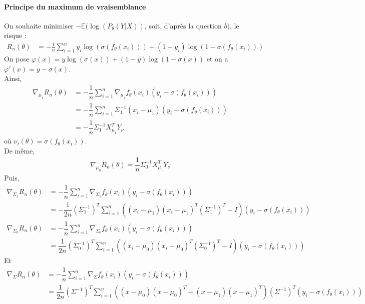 \documentclass[paper=a4, fontsize=11pt]{article}
\begin{document}
\paragraph{Principe du maximum de vraisemblance\\}
On souhaite minimiser $-\mathbb{E}(\log(P_{\theta}(Y|X))$, soit, d'après la question $b)$, le risque : 
\begin{align*}
R_n(\theta) &= -\frac{1}{n}\sum\limits_{i=1}^{n} y_i\log (\sigma(f_{\theta}(x_i))) + (1-y_i)\log(1-\sigma(f_{\theta}(x_i)))
\end{align*}
On pose $\varphi(x) =  y\log (\sigma(x)) + (1-y)\log(1-\sigma(x))$ et on a
$\varphi'(x) = y - \sigma(x)$.\\
Ainsi, 
\begin{align*}
\nabla_{\mu_1}R_n(\theta) &= -\dfrac{1}{n}\sum\limits_{i=1}^{n} \nabla_{\mu_1}f_{\theta}(x_i)(y_i - \sigma(f_{\theta}(x_i))) \\
&= -\dfrac{1}{n}\sum\limits_{i=1}^{n} \Sigma_{1}^{-1}(x_i-\mu_{1})(y_i - \sigma(f_{\theta}(x_i))) \\
&= -\dfrac{1}{n}\Sigma_{1}^{-1} X_{\mu_1}^{T}Y_{\nu}
\end{align*}
où $\nu_i(\theta) = \sigma(f_{\theta}(x_i))$.\\
De même, 
\begin{align*}
\nabla_{\mu_0}R_n(\theta) =  \dfrac{1}{n}\Sigma_{0}^{-1} X_{\mu_1}^{T}Y_{\nu}
\end{align*}
Puis, 
\begin{align*}
\nabla_{\Sigma_1}R_n(\theta) &= -\dfrac{1}{n}\sum\limits_{i=1}^{n} \nabla_{\Sigma_1}f_{\theta}(x_i)(y_i - \sigma(f_{\theta}(x_i))) \\
&= -\dfrac{1}{2n}(\Sigma_1^{-1})^{T}\sum\limits_{i=1}^{n} ((x_i-\mu_1)(x_i-\mu_1)^{T}(\Sigma_1^{-1})^{T} - I)(y_i - \sigma(f_{\theta}(x_i))) \\
\nabla_{\Sigma_0}R_n(\theta) &= -\dfrac{1}{n}\sum\limits_{i=1}^{n} \nabla_{\Sigma_0}f_{\theta}(x_i)(y_i - \sigma(f_{\theta}(x_i))) \\
&= \dfrac{1}{2n}(\Sigma_0^{-1})^{T}\sum\limits_{i=1}^{n} ((x_i-\mu_0)(x_i-\mu_0)^{T}(\Sigma_0^{-1})^{T} - I)(y_i - \sigma(f_{\theta}(x_i)))
\end{align*}
Et 
\begin{align*}
\nabla_{\Sigma}R_n(\theta) &= -\dfrac{1}{n}\sum\limits_{i=1}^{n} \nabla_{\Sigma}f_{\theta}(x_i)(y_i - \sigma(f_{\theta}(x_i))) \\
&= \dfrac{1}{2n}(\Sigma^{-1})^{T}\sum\limits_{i=1}^{n}((x-\mu_0)(x-\mu_0)^{T}-(x-\mu_1)(x-\mu_1)^{T})(\Sigma^{-1})^{T}(y_i - \sigma(f_{\theta}(x_i)))
\end{align*}
\end{document}

